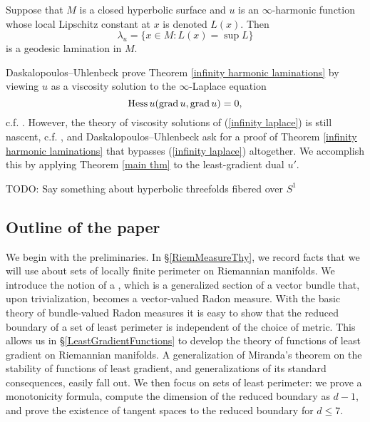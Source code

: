 \begin{theorem}\label{infinity harmonic laminations}
Suppose that $M$ is a closed hyperbolic surface and $u$ is an $\infty$-harmonic function whose local Lipschitz constant at $x$ is denoted $L(x)$. Then
$$\lambda_u = \{x \in M: L(x) = \sup L\}$$
is a geodesic lamination in $M$.
\end{theorem}

Daskalopoulos--Uhlenbeck prove Theorem \ref{infinity harmonic laminations} by viewing $u$ as a viscosity solution to the $\infty$-Laplace equation 
\begin{equation}\label{infinity laplace}
    \operatorname{Hess} u(\operatorname{grad} u, \operatorname{grad} u) = 0,
\end{equation}
c.f. \cite[\S5]{daskalopoulos2020transverse}.
However, the theory of viscosity solutions of (\ref{infinity laplace}) is still nascent, c.f. \cite{Aronsson1984} \cite{Evans08}, and Daskalopoulos--Uhlenbeck ask \cite[\S9]{daskalopoulos2020transverse} for a proof of Theorem \ref{infinity harmonic laminations} that bypasses (\ref{infinity laplace}) altogether.
We accomplish this by applying Theorem \ref{main thm} to the least-gradient dual $u'$.

TODO: Say something about hyperbolic threefolds fibered over $S^1$


\subsection{Outline of the paper}
We begin with the preliminaries.
In \S\ref{RiemMeasureThy}, we record facts that we will use about sets of locally finite perimeter on Riemannian manifolds.
We introduce the notion of a , which is a generalized section of a vector bundle that, upon trivialization, becomes a vector-valued Radon measure.
With the basic theory of bundle-valued Radon measures it is easy to show that the reduced boundary of a set of least perimeter is independent of the choice of metric.
This allows us in \S\ref{LeastGradientFunctions} to develop the theory of functions of least gradient on Riemannian manifolds. A generalization of Miranda's theorem \cite[Teorema 3]{Miranda67} on the stability of functions of least gradient, and generalizations of its standard consequences, easily fall out.
We then focus on sets of least perimeter: we prove a monotonicity formula, compute the dimension of the reduced boundary as $d - 1$, and prove the existence of tangent spaces to the reduced boundary for $d \leq 7$.


